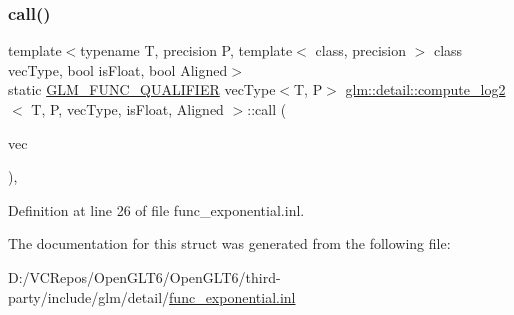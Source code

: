 \subsubsection{\texorpdfstring{call()}{call()}}
{\footnotesize\ttfamily template$<$typename T, precision P, template$<$ class, precision $>$ class vec\+Type, bool is\+Float, bool Aligned$>$ \\
static \mbox{\hyperlink{setup_8hpp_a33fdea6f91c5f834105f7415e2a64407}{G\+L\+M\+\_\+\+F\+U\+N\+C\+\_\+\+Q\+U\+A\+L\+I\+F\+I\+ER}} vec\+Type$<$T, P$>$ \mbox{\hyperlink{structglm_1_1detail_1_1compute__log2}{glm\+::detail\+::compute\+\_\+log2}}$<$ T, P, vec\+Type, is\+Float, Aligned $>$\+::call (\begin{DoxyParamCaption}\item[{vec\+Type$<$ T, P $>$ const \&}]{vec }\end{DoxyParamCaption})\hspace{0.3cm}{\ttfamily [inline]}, {\ttfamily [static]}}



Definition at line 26 of file func\+\_\+exponential.\+inl.



The documentation for this struct was generated from the following file\+:\begin{DoxyCompactItemize}
\item 
D\+:/\+V\+C\+Repos/\+Open\+G\+L\+T6/\+Open\+G\+L\+T6/third-\/party/include/glm/detail/\mbox{\hyperlink{func__exponential_8inl}{func\+\_\+exponential.\+inl}}\end{DoxyCompactItemize}
